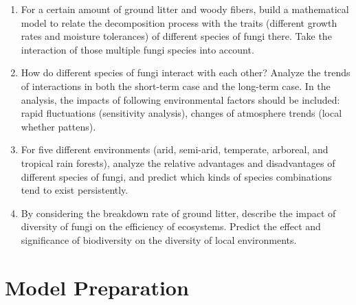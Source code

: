 \documentclass[a4paper,12pt]{article}
\begin{document}
\begin{enumerate}
 \setlength{\itemsep}{0ex} %
\item For a certain amount of ground litter and woody fibers, build a mathematical model to relate the decomposition process with the traits (different growth rates and moisture tolerances) of different species of fungi there. Take the interaction of those multiple fungi species into account.
\item How do different species of fungi interact with each other? Analyze the trends of interactions in both the short-term case and the long-term case. In the analysis, the impacts of following environmental factors should be included: rapid fluctuations (sensitivity analysis), changes of atmosphere trends (local whether pattens).
\item For five different environments (arid, semi-arid, temperate, arboreal, and tropical rain forests), analyze the relative advantages and disadvantages of different species of fungi, and predict which kinds of species combinations tend to exist persistently. 
\item By considering the breakdown rate of ground litter, describe the impact of diversity of fungi on the efficiency of ecosystems. Predict the effect and significance of biodiversity on the diversity of local environments.
\end{enumerate}

\section{Model Preparation}
\end{document}
